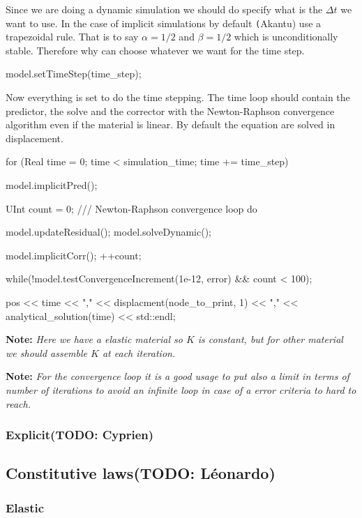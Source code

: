 \documentclass[a4paper,11pt]{book}
\newcommand{\code}[1]{{\tt{#1}}}
\newcommand{\note}[1]{\textbf{Note: }\textit{#1}}
\newcommand{\todo}[1]{({\small\color{red}\textbf{TODO: }\textbf{#1}})}
\begin{document}
Since we are doing a dynamic simulation we should do specify what is the $\Delta
t$ we want to use. In  the case of implicit simulations by default \code(Akantu)
use a trapezoidal rule. That is to say $\alpha = 1/2$ and $\beta = 1/2$ which is
unconditionally stable. Therefore  why can choose whatever we  want for the time
step.
\begin{cpp}
  model.setTimeStep(time_step);
\end{cpp}

Now everything is set to do the  time stepping. The time loop should contain the
predictor,  the solve  and  the corrector  with  the Newton-Raphson  convergence
algorithm even if the material is  linear. By default the equation are solved in
displacement.
\begin{cpp}
  for (Real time = 0; time < simulation_time; time += time_step) {
   model.implicitPred();

   UInt count = 0;
   /// Newton-Raphson convergence loop
   do {
     model.updateResidual();
     model.solveDynamic();

     model.implicitCorr();
     ++count;
   } while(!model.testConvergenceIncrement(1e-12, error) && count < 100);

   pos << time
       << "," << displacment(node_to_print, 1)
       << "," << analytical_solution(time) << std::endl;
 }
\end{cpp}

\note{Here we have a elastic material so $K$ is constant, but for other material
  we should assemble $K$ at each iteration.}

\note{For the convergence loop  it is a good usage to put  also a limit in terms
  of number of iterations to avoid an  infinite loop in case of a error criteria
  to hard to reach.}

\subsubsection{Explicit\todo{Cyprien}}

\subsection{Constitutive laws\todo{L\'eonardo}}
\subsubsection{Elastic}
\end{document}
